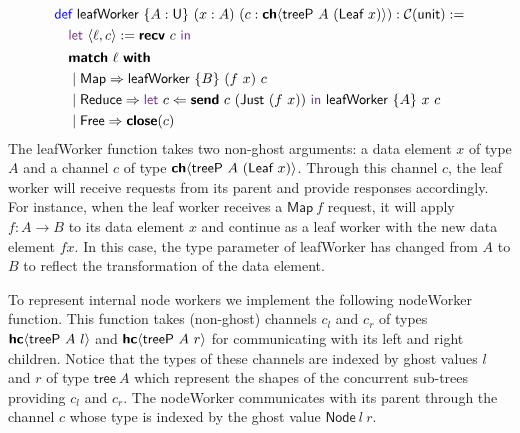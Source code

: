 \vspace{-1em}
\begingroup
\small
\addtolength{\jot}{-0.25em}
\begin{align*}
  &\Def\ \textsf{leafWorker}\ \{A : \Un\}\ (x : A)\ (c : \CH{\textsf{treeP}\ A\ (\textsf{Leaf}\ x)}) : \CM{\textsf{unit}} := \\
  &\quad\Let\ \langle{\ell, c}\rangle := \Recv\ c\ \In \\
  &\quad
    \begin{alignedat}{4}
      &\Match\ \ell\ \With\\
      &\mid \textsf{Map} \Rightarrow \textsf{leafWorker}\ \{B\}\ (f\ x)\ c \\
      &\mid \textsf{Reduce} \Rightarrow \Let\ c \Leftarrow \Send\ c\ (\textsf{Just}\ (f\ x))\ \In\ \textsf{leafWorker}\ \{A\}\ x\ c  \\
      &\mid \textsf{Free} \Rightarrow \Close(c)
    \end{alignedat}
\end{align*}
\endgroup
The \textsf{leafWorker} function takes two non-ghost arguments: a data element
$x$ of type $A$ and a channel $c$ of type
$\CH{\textsf{treeP}\ A\ (\textsf{Leaf}\ x)}$. Through this channel $c$, the leaf
worker will receive requests from its parent and provide responses accordingly.
For instance, when the leaf worker receives a $\textsf{Map}\ f$ request, it will
apply $f: A \rightarrow B$ to its data element $x$ and continue as a leaf worker
with the new data element $f x$. In this case, the type parameter of
\textsf{leafWorker} has changed from $A$ to $B$ to reflect the transformation of
the data element.

To represent internal node workers we implement the following \textsf{nodeWorker}
function. This function takes (non-ghost) channels $c_l$ and $c_r$ of
types ${\textbf{\textsf{hc}}\langle{\textsf{treeP}\ A\ l}\rangle}$ and ${\textbf{\textsf{hc}}\langle{\textsf{treeP}\ A\ r}\rangle}$ for
communicating with its left and right children. Notice that the types of these
channels are indexed by ghost values $l$ and $r$ of type $\textsf{tree}\ A$
which represent the shapes of the concurrent sub-trees providing $c_l$ and
$c_r$. The \textsf{nodeWorker} communicates with its parent through the channel
$c$ whose type is indexed by the ghost value $\textsf{Node}\ l\ r$.

